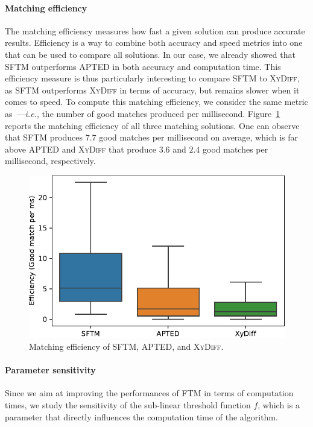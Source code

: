 \paragraph{Matching efficiency}
The matching efficiency measures how fast a given solution can produce accurate results.
Efficiency is a way to combine both accuracy and speed metrics into one that can be used to compare all solutions.
In our case, we already showed that SFTM outperforms APTED in both accuracy and computation time.
This efficiency measure is thus particularly interesting to compare SFTM to \textsc{XyDiff}, as SFTM outperforms \textsc{XyDiff} in terms of accuracy, but remains slower when it comes to speed.
To compute this matching efficiency, we consider the same metric as~\cite{oliveira2018efficient}---\emph{i.e.}, the number of good matches produced per millisecond.
Figure~\ref{sftm:fig:efficiency} reports the matching efficiency of all three matching solutions.
One can observe that SFTM produces $7.7$ good matches per millisecond on average, which is far above APTED and \textsc{XyDiff} that produce $3.6$ and $2.4$ good matches per millisecond, respectively. 

\begin{figure}
    \centering
    \includegraphics[width=.8\linewidth]{tree-matching/graphs/efficiency}
    \caption{Matching efficiency of SFTM, APTED, and \textsc{XyDiff}.}
    \label{sftm:fig:efficiency}
\end{figure}

\paragraph{Parameter sensitivity}
Since we aim at improving the performances of FTM in terms of computation times, we study the sensitivity of the sub-linear threshold function $f$, which is a parameter that directly influences the computation time of the algorithm.


